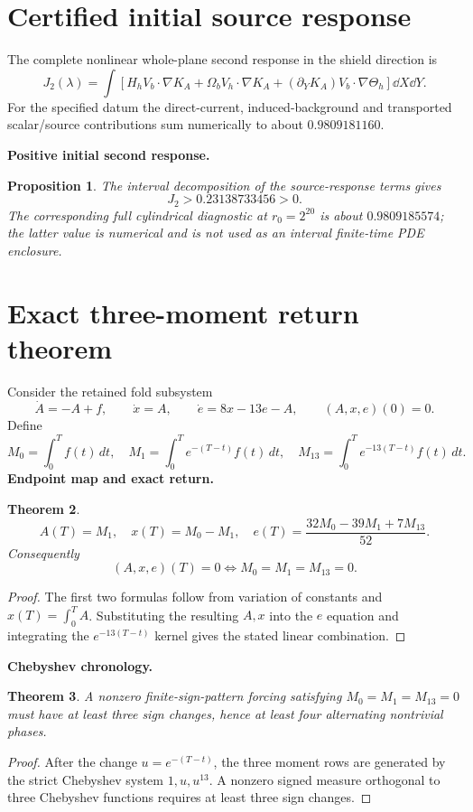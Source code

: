 \documentclass[11pt]{article}
\newtheorem{theorem}{Theorem}[section]\newtheorem{proposition}[theorem]{Proposition}
\theoremstyle{definition}\newtheorem{definition}[theorem]{Definition}\newtheorem{problem}[theorem]{Problem}
\theoremstyle{remark}\newtheorem{remark}[theorem]{Remark}
\begin{document}
\section{Certified initial source response}
The complete nonlinear whole-plane second response in the shield direction is
\[
J_2(\lambda)=\int\left[
H_hV_b\cdot\nabla K_A
+\Omega_bV_h\cdot\nabla K_A
+(\partial_YK_A)V_b\cdot\nabla\Theta_h
\right]\dd X\dd Y.
\]
For the specified datum the direct-current, induced-background and transported
scalar/source contributions sum numerically to about $0.9809181160$.

\medskip
\noindent\textbf{Positive initial second response.}
\begin{proposition}
The interval decomposition of the source-response terms gives
\[
\boxed{J_2>0.23138733456>0}.
\]
The corresponding full cylindrical diagnostic at $r_0=2^{20}$ is about
$0.9809185574$; the latter value is numerical and is not used as an interval
finite-time PDE enclosure.
\end{proposition}

\section{Exact three-moment return theorem}
Consider the retained fold subsystem
\[
\dot A=-A+f,\qquad \dot x=A,\qquad \dot e=8x-13e-A,
\qquad (A,x,e)(0)=0.
\]
Define
\[
M_0=\int_0^T f(t)\,dt,\quad
M_1=\int_0^T e^{-(T-t)}f(t)\,dt,\quad
M_{13}=\int_0^T e^{-13(T-t)}f(t)\,dt.
\]
\medskip
\noindent\textbf{Endpoint map and exact return.}
\begin{theorem}
\[
\boxed{A(T)=M_1,\quad x(T)=M_0-M_1,\quad
 e(T)=\frac{32M_0-39M_1+7M_{13}}{52}.}
\]
Consequently
\[
\boxed{(A,x,e)(T)=0\iff M_0=M_1=M_{13}=0.}
\]
\end{theorem}
\begin{proof}
The first two formulas follow from variation of constants and
$x(T)=\int_0^TA$.  Substituting the resulting $A,x$ into the $e$ equation and
integrating the $e^{-13(T-t)}$ kernel gives the stated linear combination.
\end{proof}

\medskip
\noindent\textbf{Chebyshev chronology.}
\begin{theorem}
A nonzero finite-sign-pattern forcing satisfying
$M_0=M_1=M_{13}=0$ must have at least three sign changes, hence at least four
alternating nontrivial phases.
\end{theorem}
\begin{proof}
After the change $u=e^{-(T-t)}$, the three moment rows are generated by the
strict Chebyshev system $1,u,u^{13}$.  A nonzero signed measure orthogonal to
three Chebyshev functions requires at least three sign changes.
\end{proof}
\end{document}
